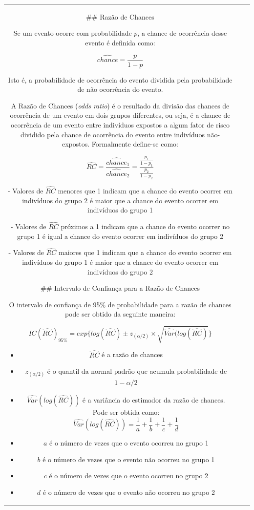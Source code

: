 \documentclass[
]{estat/estat}
\begin{document}
\begin{tabular}{c|cc}
## Razão de Chances

Se um evento ocorre com probabilidade $p$, a chance de ocorrência desse evento é definida como:

$$\hat{chance}=\frac{p}{1-p}$$

Isto é, a probabilidade de ocorrência do evento dividida pela probabilidade de não ocorrência do evento.

A Razão de Chances (\textit{odds ratio}) é o resultado da divisão das chances de ocorrência de um evento em dois grupos diferentes, ou seja, é a chance de ocorrência de um evento entre indivíduos expostos a algum fator de risco dividido pela chance de ocorrência do evento entre indivíduos não-expostos. Formalmente define-se como:

$$\hat{RC}=\frac{\hat{chance}_1}{\hat{chance}_2}=\frac{\frac{p_1}{1-p_1}}{\frac{p_2}{1-p_2}}$$

-   Valores de $\hat{RC}$ menores que 1 indicam que a chance do evento ocorrer em indivíduos do grupo 2 é maior que a chance do evento ocorrer em indivíduos do grupo 1

-   Valores de $\hat{RC}$ próximos a 1 indicam que a chance do evento ocorrer no grupo 1 é igual a chance do evento ocorrer em indivíduos do grupo 2

-   Valores de $\hat{RC}$ maiores que 1 indicam que a chance do evento ocorrer em indivíduos do grupo 1 é maior que a chance do evento ocorrer em indivíduos do grupo 2

## Intervalo de Confiança para a Razão de Chances

\par O intervalo de confiança de 95\% de probabilidade para a razão de chances pode ser obtido da seguinte maneira:

$$IC(\hat{RC})_{95\%}=exp\{log(\hat{RC})\pm z_{(\alpha/2)}\times\sqrt{\hat{Var}(log(\hat{RC})}\}$$

\begin{itemize}

    \item $\hat{RC}$ é a razão de chances
    \item $z_{(\alpha/2)}$ é o quantil da normal padrão que acumula probabilidade de $1-\alpha/2$
    \item $\hat{Var}(log(\hat{RC}))$ é a variância do estimador da razão de chances. Pode ser obtida como:
    $$\hat{Var}(log(\hat{RC}))=\frac{1}{a}+\frac{1}{b}+\frac{1}{c}+\frac{1}{d}$$
    
    \item $a$ é o número de vezes que o evento ocorreu no grupo 1
    \item $b$ é o número de vezes que o evento não ocorreu no grupo 1
    \item $c$ é o número de vezes que o evento ocorreu no grupo 2
    \item $d$ é o número de vezes que o evento não ocorreu no grupo 2
    

\end{itemize}
\end{tabular}
\end{document}
